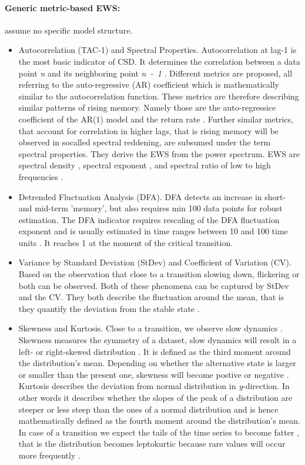 \paragraph{Generic metric-based EWS:}
assume no specific model structure.
\begin{itemize}
	\item Autocorrelation (TAC-1) and Spectral Properties. Autocorrelation at lag-1 is the most basic indicator of CSD. It determines the correlation between a data point \textit{n} and its neighboring point \textit{n~-~1} \citep{carpenter2008}. Different metrics are proposed, all referring to the auto-regressive (AR) coefficient which is mathematically similar to the autocorrelation function. These metrics are therefore describing similar patterns of rising memory. Namely those are the auto-regressice coefficient of the AR(1) model \citep{held2004} and the return rate \citep[inverse of AR(1) coefficient][]{carpenter2008}. Further similar metrics, that account for correlation in higher lags, that is rising memory will be observed in socalled spectral reddening, are subsumed under the term spectral properties. They derive the EWS from the power spectrum. EWS are spectral density \citep{kleinen2003}, spectral exponent \citep{dakos2012}, and spectral ratio of low to high frequencies \citep{biggs2009}.
	\item Detrended Fluctuation Analysis (DFA). DFA detects an increase in short- and mid-term 'memory', but also requires min 100 data points for robust estimation. The DFA indicator requires rescaling of the DFA fluctuation exponent and is usually estimated in time ranges between 10 and 100 time units \citep{livina2007}. It reaches 1 at the moment of the critical transition.
	\item Variance by Standard Deviation (StDev) and Coefficient of Variation (CV). Based on the observation that close to a transition slowing down, \gls{flickering} or both can be observed. Both of these phenomena can be captured by StDev and the CV. They both describe the fluctuation around the mean, that is they quantify the deviation from the stable state \citep{carpenter2006}.
	\item Skewness and Kurtosis. Close to a transition, we observe slow dynamics \citep{scheffer2009b}. Skewness measures the symmetry of a dataset, slow dynamics will result in a left- or right-skewed distribution \citep{guttal2008}. It is defined as the third moment around the distribution's mean. Depending on whether the alternative state is larger or smaller than the present one, skewness will become postive or negative \citep{dakos2012}. Kurtosis describes the deviation from normal distribution in \textit{y}-direction. In other words it describes whether the slopes of the peak of a distribution are steeper or less steep than the ones of a normal distribution and is hence mathematically defined as the fourth moment around the distribution's mean. In case of a transition we expect the tails of the time series to become fatter \citep{biggs2009}, that is the distribution becomes leptokurtic because rare values will occur more frequently \citep{dakos2012}.

\end{itemize}
